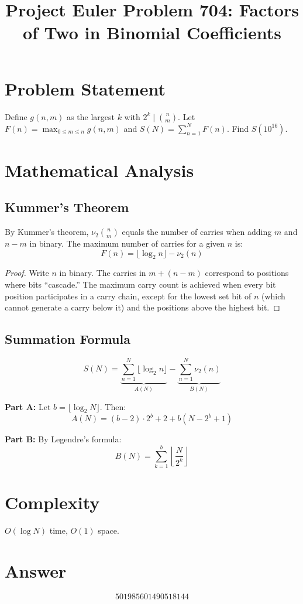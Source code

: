 \documentclass[12pt]{article}
\title{Project Euler Problem 704: Factors of Two in Binomial Coefficients}
\author{}
\date{}
\begin{document}
\maketitle

\section{Problem Statement}
Define $g(n,m)$ as the largest $k$ with $2^k \mid \binom{n}{m}$. Let $F(n) = \max_{0 \le m \le n} g(n,m)$ and $S(N) = \sum_{n=1}^N F(n)$. Find $S(10^{16})$.

\section{Mathematical Analysis}

\subsection{Kummer's Theorem}
By Kummer's theorem, $\nu_2\binom{n}{m}$ equals the number of carries when adding $m$ and $n-m$ in binary. The maximum number of carries for a given $n$ is:
\[
F(n) = \lfloor \log_2 n \rfloor - \nu_2(n)
\]

\begin{proof}
Write $n$ in binary. The carries in $m + (n-m)$ correspond to positions where bits ``cascade.'' The maximum carry count is achieved when every bit position participates in a carry chain, except for the lowest set bit of $n$ (which cannot generate a carry below it) and the positions above the highest bit.
\end{proof}

\subsection{Summation Formula}
\[
S(N) = \underbrace{\sum_{n=1}^N \lfloor \log_2 n \rfloor}_{A(N)} - \underbrace{\sum_{n=1}^N \nu_2(n)}_{B(N)}
\]

\textbf{Part A:} Let $b = \lfloor \log_2 N \rfloor$. Then:
\[
A(N) = (b-2) \cdot 2^b + 2 + b(N - 2^b + 1)
\]

\textbf{Part B:} By Legendre's formula:
\[
B(N) = \sum_{k=1}^{b} \left\lfloor \frac{N}{2^k} \right\rfloor
\]

\section{Complexity}
$O(\log N)$ time, $O(1)$ space.

\section{Answer}

\[
\boxed{501985601490518144}
\]
\end{document}
